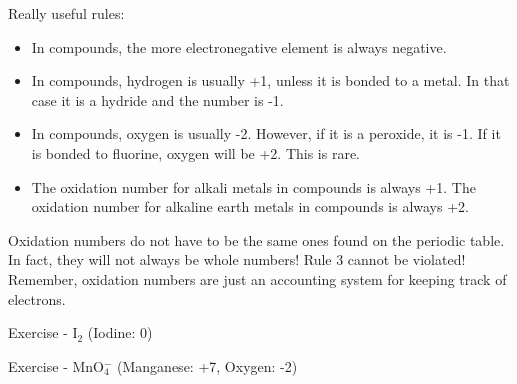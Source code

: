 \documentclass[../hchem.tex]{subfiles}
\begin{document}
Really useful rules:
\begin{itemize}
    \item In compounds, the more electronegative element is always negative.
    \item In compounds, hydrogen is usually +1, unless it is bonded to a metal. In that case it is a hydride and the number is -1.
    \item In compounds, oxygen is usually -2. However, if it is a peroxide, it is -1. If it is bonded to fluorine, oxygen will be +2. This is rare.
    \item The oxidation number for alkali metals in compounds is always +1. The oxidation number for alkaline earth metals in compounds is always +2.
\end{itemize}

Oxidation numbers do not have to be the same ones found on the periodic table. In fact, they will not always be whole numbers! 
Rule 3 cannot be violated! Remember, oxidation numbers are just an accounting system for keeping track of electrons.

Exercise - I$_2$ (Iodine: 0)

Exercise - MnO$_4^-$ (Manganese: +7, Oxygen: -2)
\end{document}
